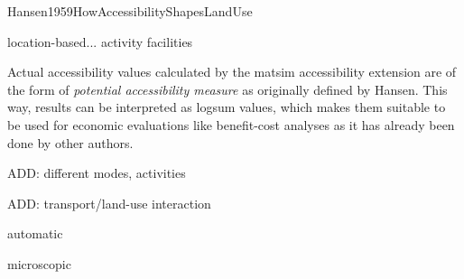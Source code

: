 Hansen1959HowAccessibilityShapesLandUse

location-based... activity facilities

Actual accessibility values calculated by the \gls{matsim} accessibility extension are of the form of \textit{potential 
	accessibility measure} as originally defined by Hansen. This way, results can be interpreted as \gls{logsum} values, 
which makes them suitable to be used for economic evaluations like benefit-cost analyses as it has already been done 
by other authors.



ADD: different modes, activities

ADD: transport/land-use interaction

automatic

microscopic






%
%




